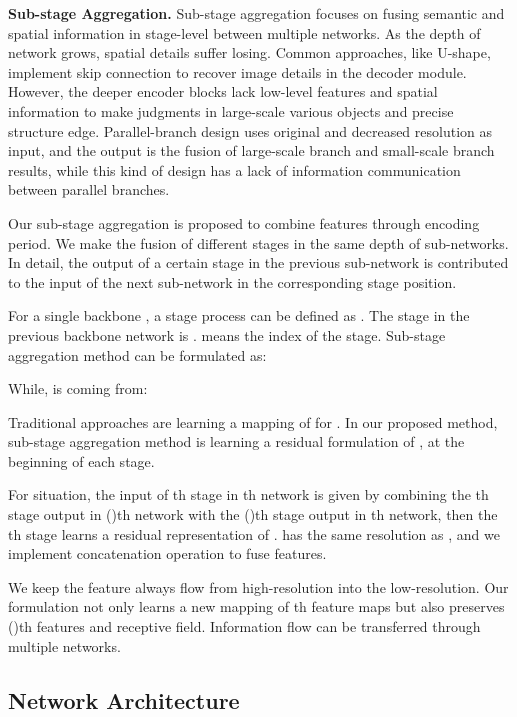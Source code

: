 \documentclass[10pt,twocolumn,letterpaper]{article}
\begin{document}
\textbf{Sub-stage Aggregation.} Sub-stage aggregation focuses on fusing semantic and spatial information in stage-level between multiple networks. As the depth of network grows, spatial details suffer losing. Common approaches, like U-shape, implement skip connection to recover image details in the decoder module. However, the deeper  encoder blocks lack low-level features and spatial information to make judgments in large-scale various objects and precise structure edge. Parallel-branch design uses original and decreased resolution as input, and the output is the fusion of large-scale branch and small-scale branch results, while this kind of design has a lack of information communication between parallel branches.

Our sub-stage aggregation is proposed to combine features through encoding period. We make the fusion of different stages in the same depth of sub-networks.
In detail, the output of a certain stage in the previous sub-network is contributed to the input of the next sub-network in the corresponding stage position.


For a single backbone , a stage process can be defined as . The stage in the previous backbone network is . \text{ } means the index of the stage. Sub-stage aggregation method can be formulated as:









While,  is coming from:


Traditional approaches are learning a mapping of  for . In our proposed method, sub-stage aggregation method is learning a residual formulation of , at the beginning of each stage.

For  situation, the input of th stage in th network is given by combining the th stage output in ()th network with the ()th stage output in th network, then the th stage learns a residual representation of .  has the same resolution as , and we implement concatenation operation to fuse features.

We keep the feature always flow from high-resolution into the low-resolution.
Our formulation not only learns a new mapping of th feature maps but also preserves ()th features and receptive field. Information flow can be transferred through multiple networks.

\subsection{Network Architecture}
\label{sec:fc}
\end{document}
